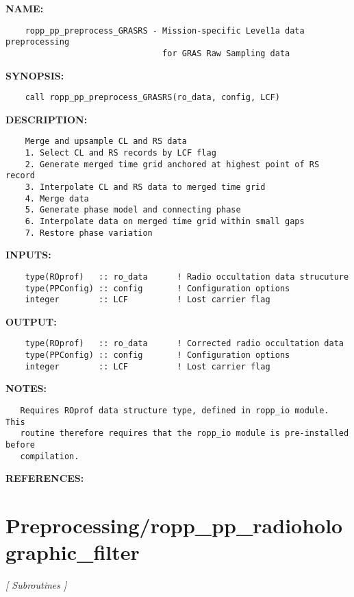 \label{ch:robo82}
\label{ch:Preprocessing_ropp_pp_preprocess_GRASRS}
\textbf{NAME:}\hspace{0.08in}\begin{Verbatim}
    ropp_pp_preprocess_GRASRS - Mission-specific Level1a data preprocessing
                                for GRAS Raw Sampling data
\end{Verbatim}
\textbf{SYNOPSIS:}\hspace{0.08in}\begin{Verbatim}
    call ropp_pp_preprocess_GRASRS(ro_data, config, LCF)
\end{Verbatim}
\textbf{DESCRIPTION:}\hspace{0.08in}\begin{Verbatim}
    Merge and upsample CL and RS data
    1. Select CL and RS records by LCF flag
    2. Generate merged time grid anchored at highest point of RS record
    3. Interpolate CL and RS data to merged time grid
    4. Merge data
    5. Generate phase model and connecting phase
    6. Interpolate data on merged time grid within small gaps
    7. Restore phase variation
\end{Verbatim}
\textbf{INPUTS:}\hspace{0.08in}\begin{Verbatim}
    type(ROprof)   :: ro_data      ! Radio occultation data strucuture
    type(PPConfig) :: config       ! Configuration options
    integer        :: LCF          ! Lost carrier flag
\end{Verbatim}
\textbf{OUTPUT:}\hspace{0.08in}\begin{Verbatim}
    type(ROprof)   :: ro_data      ! Corrected radio occultation data
    type(PPConfig) :: config       ! Configuration options
    integer        :: LCF          ! Lost carrier flag
\end{Verbatim}
\textbf{NOTES:}\hspace{0.08in}\begin{Verbatim}
   Requires ROprof data structure type, defined in ropp_io module. This
   routine therefore requires that the ropp_io module is pre-installed before
   compilation.
\end{Verbatim}
\textbf{REFERENCES:}\hspace{0.08in}\section{Preprocessing/ropp\_pp\_radioholographic\_filter}
\textsl{[ Subroutines ]}

